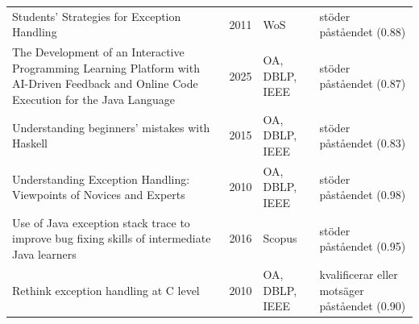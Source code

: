 \begin{longtable}{@{}%
  >{\raggedright\arraybackslash}p{}c%
  >{\raggedright\arraybackslash}p{}%
  >{\raggedright\arraybackslash}p{}@{}}
Students' Strategies for Exception Handling & 2011 & WoS & stöder påståendet (0.88) \\
The Development of an Interactive Programming Learning Platform with AI-Driven Feedback and Online Code Execution for the Java Language & 2025 & OA, DBLP, IEEE & stöder påståendet (0.87) \\
Understanding beginners' mistakes with Haskell & 2015 & OA, DBLP, IEEE & stöder påståendet (0.83) \\
Understanding Exception Handling: Viewpoints of Novices and Experts & 2010 & OA, DBLP, IEEE & stöder påståendet (0.98) \\
Use of Java exception stack trace to improve bug fixing skills of intermediate Java learners & 2016 & Scopus & stöder påståendet (0.95) \\
Rethink exception handling at C level & 2010 & OA, DBLP, IEEE & kvalificerar eller motsäger påståendet (0.90) \\
\end{longtable}
\endgroup
